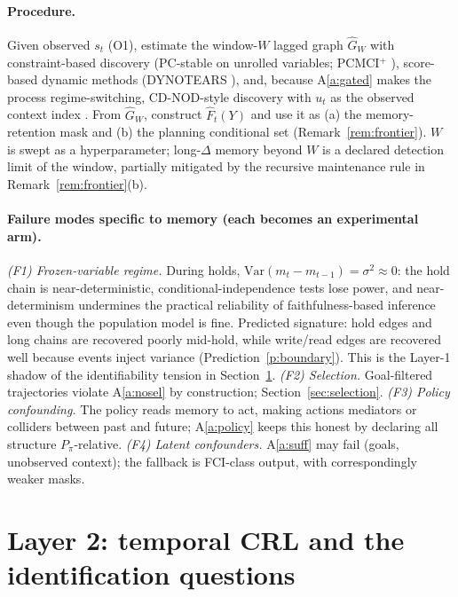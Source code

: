 \documentclass[11pt]{article}
\theoremstyle{plain}
\theoremstyle{definition}
\begin{document}
\paragraph{Procedure.} Given observed $s_t$ (O1), estimate the window-$W$ lagged graph $\hat G_W$ with constraint-based discovery (PC-stable on unrolled variables; PCMCI$^+$ \cite{runge2020}), score-based dynamic methods (DYNOTEARS \cite{pamfil2020}), and, because A\ref{a:gated} makes the process regime-switching, CD-NOD-style discovery with $u_t$ as the observed context index \cite{huang2020}. From $\hat G_W$, construct $\hat F_t(Y)$ and use it as (a) the memory-retention mask and (b) the planning conditional set (Remark~\ref{rem:frontier}). $W$ is swept as a hyperparameter; long-$\Delta$ memory beyond $W$ is a declared detection limit of the window, partially mitigated by the recursive maintenance rule in Remark~\ref{rem:frontier}(b).

\paragraph{Failure modes specific to memory (each becomes an experimental arm).}
\emph{(F1) Frozen-variable regime.} During holds, $\mathrm{Var}(m_t - m_{t-1}) = \sigma^2 \approx 0$: the hold chain is near-deterministic, conditional-independence tests lose power, and near-determinism undermines the practical reliability of faithfulness-based inference even though the population model is fine. Predicted signature: hold edges and long chains are recovered poorly mid-hold, while write/read edges are recovered well because events inject variance (Prediction~\ref{p:boundary}). This is the Layer-1 shadow of the identifiability tension in Section~\ref{sec:layer2}.
\emph{(F2) Selection.} Goal-filtered trajectories violate A\ref{a:nosel} by construction; Section~\ref{sec:selection}.
\emph{(F3) Policy confounding.} The policy reads memory to act, making actions mediators or colliders between past and future; A\ref{a:policy} keeps this honest by declaring all structure $P_\pi$-relative.
\emph{(F4) Latent confounders.} A\ref{a:suff} may fail (goals, unobserved context); the fallback is FCI-class output, with correspondingly weaker masks.

\section{Layer 2: temporal CRL and the identification questions}\label{sec:layer2}
\end{document}
